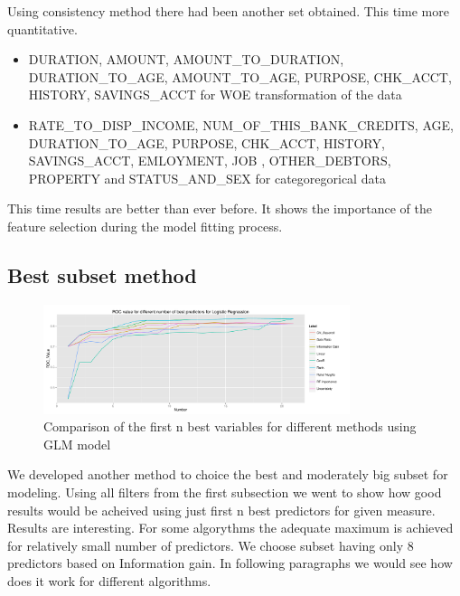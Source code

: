 \documentclass[10pt]{article}\usepackage[]{graphicx}\usepackage[]{color}
\begin{document}
Using consistency method there had been another set obtained. This time more quantitative. 

\begin{itemize}

\item DURATION, AMOUNT, AMOUNT\_TO\_DURATION, DURATION\_TO\_AGE, 
    AMOUNT\_TO\_AGE, PURPOSE, CHK\_ACCT, HISTORY, 
    SAVINGS\_ACCT for WOE transformation of the data
    
\item RATE\_TO\_DISP\_INCOME, NUM\_OF\_THIS\_BANK\_CREDITS, AGE, 
    DURATION\_TO\_AGE, PURPOSE, CHK\_ACCT, HISTORY, SAVINGS\_ACCT, 
    EMLOYMENT,  JOB , OTHER\_DEBTORS, PROPERTY and STATUS\_AND\_SEX for categoregorical data
\end{itemize}

This time results are better than ever before. It shows the importance of the feature selection during the model fitting process. 

\subsection{Best subset method}



\begin{figure}[h!]
  \centering
  \includegraphics[width=0.8\textwidth]{Plots/Rplot}
  \caption[Close up of \textit{Hemidactylus} sp.]
   {Comparison of the first n best variables for different methods using GLM model}
\end{figure}

We developed another method to choice the best and moderately big subset for modeling. Using all filters from the first subsection we went to show how good results would be acheived using just first n best predictors for given measure. 
Results are interesting. For some algorythms the adequate maximum is achieved for relatively small number of predictors. 
We choose subset having only 8 predictors based on Information gain. In following paragraphs we would see how does it work for different algorithms.
\end{document}

